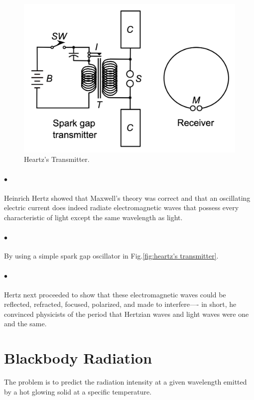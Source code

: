 \documentclass[a4paper]{report}
\begin{document}
            \begin{figure}
                \includegraphics[width=0.9\linewidth]{figures/Hertz_transmitter.png}
                \caption{Heartz's Transmitter.}
                \label{fig:heartz's transmitter}
            \end{figure}

            \paragraph{$\bullet$} Heinrich Hertz showed that Maxwell’s theory was correct and that an oscillating electric 
            current does indeed radiate electromagnetic waves that possess every characteristic of light 
            except the same wavelength as light.  

            \paragraph{$\bullet$} By using a simple spark gap oscillator in Fig.\eqref{fig:heartz's transmitter}.

            \paragraph{$\bullet$} Hertz next proceeded to show that these electromagnetic waves could be reflected, 
            refracted, focused, polarized, and made to interfere—- in short, he convinced physicists 
            of the period that Hertzian waves and light waves were one and the same.
            
        \section{Blackbody Radiation}
            The problem is to predict the radiation intensity at a given wavelength emitted by 
            a hot glowing solid at a specific temperature.
\end{document}

